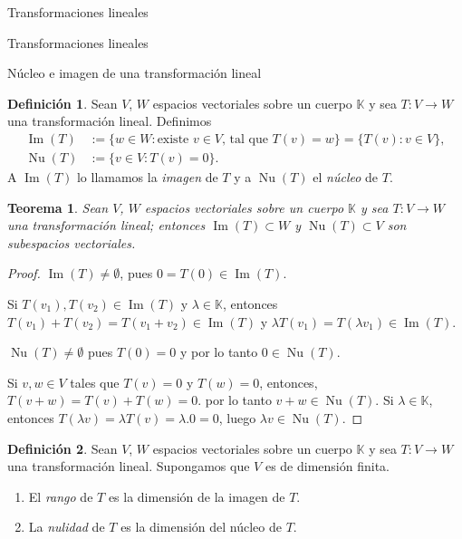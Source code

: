 \documentclass[a4paper,12pt,twoside,spanish,reqno]{amsbook}
\newtheorem{teorema}{Teorema}[section]
\theoremstyle{definition}
\newtheorem{definicion}{Definici\'on}[section]
\theoremstyle{remark}
\newcommand{\img}{\operatorname{Im}}
\newcommand{\nuc}{\operatorname{Nu}}
\newcommand{\K}{\mathbb K}
\begin{document}
\begin{chapter}{Transformaciones lineales}
\begin{section}{Transformaciones lineales}
        \end{section}
    
    
        \begin{section}{Núcleo e imagen de una transformación lineal}
        
        \begin{definicion}
            Sean $V$, $W$ espacios vectoriales sobre un cuerpo $\K$ y sea $T:V \to W$ una transformación lineal.  Definimos
            \begin{align*}
                \img(T) &:= \{w \in W:\text{existe $v \in V$, tal que } T(v)=w\} = \{T(v): v \in V \}, \\
                \nuc(T) &:= \{v \in V: T(v)=0 \}. 
            \end{align*}
            A $\img(T)$ lo llamamos la \textit{imagen} de $T$ y a $ \nuc(T)$ el \textit{núcleo} de $T$. 
        \end{definicion}
        
        \begin{teorema}
            Sean $V$, $W$ espacios vectoriales sobre un cuerpo $\K$ y sea $T:V \to W$ una transformación lineal; entonces $\img(T) \subset W$ y $\nuc(T) \subset V$ son subespacios vectoriales.
        \end{teorema}
        \begin{proof}
            $\img(T) \ne \emptyset$, pues $0 = T(0) \in \img(T)$. 
            
            Si $T(v_1),T(v_2) \in \img(T)$ y $\lambda \in \K$,  entonces $T(v_1) + T(v_2) = T(v_1+v_2) \in \img(T)$ y $\lambda T(v_1) = T(\lambda v_1) \in \img(T)$.
            
            
            $\nuc(T) \ne \emptyset$ pues $T(0) =0$ y por lo tanto $0 \in \nuc(T)$.
            
            Si $v,w \in V$ tales que $T(v) =0$ y $T(w)=0$,  entonces, $T(v+w)= T(v)+T(w) =0$. por lo tanto $v+w \in \nuc(T)$. Si  $\lambda \in \K$,  entonces $T(\lambda v) = \lambda T(v) = \lambda.0 =0$, luego  $\lambda v \in \nuc(T)$.
        \end{proof}

    
        \begin{definicion}
            Sean $V$, $W$ espacios vectoriales sobre un cuerpo $\K$ y sea $T:V \to W$ una transformación lineal. Supongamos que $V$ es de dimensión finita.
            \begin{enumerate}
\item El \textit{rango} de $T$ es la dimensión de la imagen de $T$.
\item La \textit{nulidad} de $T$ es la dimensión del núcleo  de $T$.
            \end{enumerate}
            

\end{definicion}
\end{section}
\end{chapter}
\end{document}
